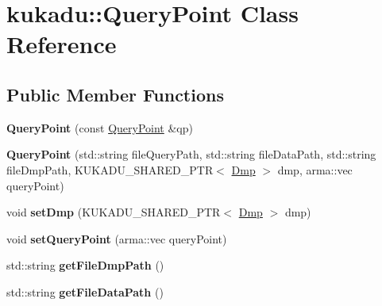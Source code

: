 \hypertarget{classkukadu_1_1QueryPoint}{}\section{kukadu\+:\+:Query\+Point Class Reference}
\label{classkukadu_1_1QueryPoint}
\subsection*{Public Member Functions}
\begin{DoxyCompactItemize}
\item 
{\bfseries Query\+Point} (const \hyperlink{classkukadu_1_1QueryPoint}{Query\+Point} \&qp)\hypertarget{classkukadu_1_1QueryPoint_a9a5ddbc46dc20f520b466ccc3c25c691}{}\label{classkukadu_1_1QueryPoint_a9a5ddbc46dc20f520b466ccc3c25c691}

\item 
{\bfseries Query\+Point} (std\+::string file\+Query\+Path, std\+::string file\+Data\+Path, std\+::string file\+Dmp\+Path, K\+U\+K\+A\+D\+U\+\_\+\+S\+H\+A\+R\+E\+D\+\_\+\+P\+TR$<$ \hyperlink{classkukadu_1_1Dmp}{Dmp} $>$ dmp, arma\+::vec query\+Point)\hypertarget{classkukadu_1_1QueryPoint_a85ff441f9ac371bf1f47482c82fe2f13}{}\label{classkukadu_1_1QueryPoint_a85ff441f9ac371bf1f47482c82fe2f13}

\item 
void {\bfseries set\+Dmp} (K\+U\+K\+A\+D\+U\+\_\+\+S\+H\+A\+R\+E\+D\+\_\+\+P\+TR$<$ \hyperlink{classkukadu_1_1Dmp}{Dmp} $>$ dmp)\hypertarget{classkukadu_1_1QueryPoint_a205098f0b021010a83b3b70648e6c595}{}\label{classkukadu_1_1QueryPoint_a205098f0b021010a83b3b70648e6c595}

\item 
void {\bfseries set\+Query\+Point} (arma\+::vec query\+Point)\hypertarget{classkukadu_1_1QueryPoint_a7f239b2985488650e941695d21eac947}{}\label{classkukadu_1_1QueryPoint_a7f239b2985488650e941695d21eac947}

\item 
std\+::string {\bfseries get\+File\+Dmp\+Path} ()\hypertarget{classkukadu_1_1QueryPoint_a7daf2238dc957d79bb42022102217655}{}\label{classkukadu_1_1QueryPoint_a7daf2238dc957d79bb42022102217655}

\item 
std\+::string {\bfseries get\+File\+Data\+Path} ()\hypertarget{classkukadu_1_1QueryPoint_af6c968a3263c590334df7b26169322cf}{}\label{classkukadu_1_1QueryPoint_af6c968a3263c590334df7b26169322cf}


\end{DoxyCompactItemize}
